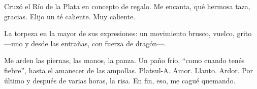 
Cruzó el Río de la Plata en concepto de regalo. Me encanta, qué hermosa
taza, gracias. Elijo un té caliente. Muy caliente.

La torpeza en la mayor de sus expresiones: un movimiento brusco, vuelco,
grito ---uno y desde las entrañas, con fuerza de dragón---.

Me arden las piernas, las manos, la panza. Un paño frío, ``como cuando
tenés fiebre'', hasta el amanecer de las ampollas. Platsul-A. Amor.
Llanto. Ardor. Por último y después de varias horas, la risa. En fin,
eso, me cagué quemando.

